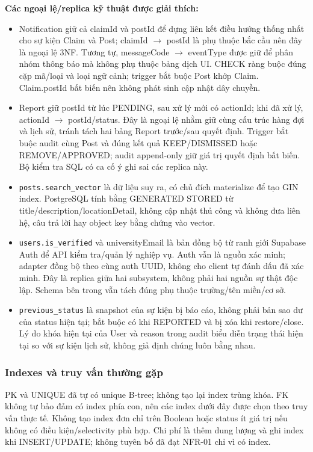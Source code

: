 \textbf{Các ngoại lệ/replica kỹ thuật được giải thích:}
\begin{itemize}
\item Notification giữ cả claimId và postId để dựng liên kết điều hướng thống nhất cho sự kiện Claim và Post; claimId $\to$ postId là phụ thuộc bắc cầu nên đây là ngoại lệ 3NF. Tương tự, messageCode $\to$ eventType được giữ để phân nhóm thông báo mà không phụ thuộc bảng dịch UI. CHECK ràng buộc đúng cặp mã/loại và loại ngữ cảnh; trigger bắt buộc Post khớp Claim. Claim.postId bất biến nên không phát sinh cập nhật dây chuyền.
\item Report giữ postId từ lúc PENDING, sau xử lý mới có actionId; khi đã xử lý, actionId $\to$ postId/status. Đây là ngoại lệ nhằm giữ cùng cấu trúc hàng đợi và lịch sử, tránh tách hai bảng Report trước/sau quyết định. Trigger bắt buộc audit cùng Post và đúng kết quả KEEP/DISMISSED hoặc REMOVE/APPROVED; audit append-only giữ giá trị quyết định bất biến. Bộ kiểm tra SQL có ca cố ý ghi sai các replica này.
\item \texttt{posts.search\_vector} là dữ liệu suy ra, có chủ đích materialize để tạo GIN index. PostgreSQL tính bằng GENERATED STORED từ title/description/locationDetail, không cập nhật thủ công và không đưa liên hệ, câu trả lời hay object key bằng chứng vào vector.
\item \texttt{users.is\_verified} và universityEmail là bản đồng bộ từ ranh giới Supabase Auth để API kiểm tra/quản lý nghiệp vụ. Auth vẫn là nguồn xác minh; adapter đồng bộ theo cùng auth UUID, không cho client tự đánh dấu đã xác minh. Đây là replica giữa hai subsystem, không phải hai nguồn sự thật độc lập. Schema bên trong vẫn tách đúng phụ thuộc trường/tên miền/cơ sở.
\item \texttt{previous\_status} là snapshot của sự kiện bị báo cáo, không phải bản sao dư của status hiện tại; bắt buộc có khi REPORTED và bị xóa khi restore/close. Lý do khóa hiện tại của User và reason trong audit biểu diễn trạng thái hiện tại so với sự kiện lịch sử, không giả định chúng luôn bằng nhau.
\end{itemize}

\subsubsection{Indexes và truy vấn thường gặp}
PK và UNIQUE đã tự có unique B-tree; không tạo lại index trùng khóa. FK không tự bảo đảm có index phía con, nên các index dưới đây được chọn theo truy vấn thực tế. Không tạo index đơn chỉ trên Boolean hoặc status ít giá trị nếu không có điều kiện/selectivity phù hợp. Chi phí là thêm dung lượng và ghi index khi INSERT/UPDATE; không tuyên bố đã đạt NFR-01 chỉ vì có index.


